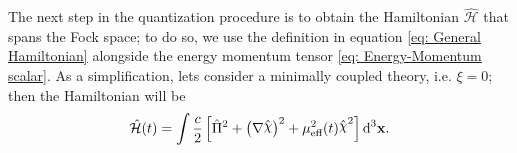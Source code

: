 \vspace*{0.25cm}
The next step in the quantization procedure is to obtain the Hamiltonian $\hat{\mathcal{H}}$ that spans the Fock space; to do so, we use the definition in equation \ref{eq: General Hamiltonian} alongside the energy momentum tensor \ref{eq: Energy-Momentum scalar}. As a simplification, lets consider a minimally coupled theory, i.e. $\xi=0$; then the Hamiltonian will be
\begin{equation}
	\hat{\mathcal{H}}(t)=\int\frac{c}{2}\left[\hat{\Pi}^2+\left(\mathbf{\nabla}\hat{\rchi}\right)^2+\mu_{\text{eff}}^2(t)\hat{\rchi}^2\right]\td^3\mathbf{x}.
\end{equation}
\begin{comment}
	\begin{multline}
		\hat{\Pi}^2=\frac{1}{c^2}\int\frac{\td^3\mathbf{k}\td^3\mathbf{q}}{(2\pi\hbar)^6}\left[\hat{a}_\mathbf{k}\hat{a}_\mathbf{q}v'_\mathbf{k}v'_\mathbf{q}e^{-i(\mathbf{k}+\mathbf{q})\mathbf{x}\hbar^{-1}}+\hat{a}_\mathbf{k}\hat{a}_\mathbf{q}^\dagger v'_\mathbf{k}v^{'*}_\mathbf{q}e^{-i(\mathbf{k}-\mathbf{q})\mathbf{x}\hbar^{-1}}\right.+\\
		+\left.\hat{a}^\dagger_\mathbf{k}\hat{a}_\mathbf{q}v^{'*}_\mathbf{k}v'_\mathbf{q}e^{i(\mathbf{k}-\mathbf{q})\mathbf{x}\hbar^{-1}}+\hat{a}_\mathbf{k}^\dagger\hat{a}_\mathbf{q}^\dagger v^{'*}_\mathbf{k}v^{'*}_\mathbf{q}e^{i(\mathbf{k}+\mathbf{q})\mathbf{x}\hbar^{-1}}\right]
	\end{multline}
	\begin{multline}
		\left(\mathbf{\nabla}\hat{\rchi}\right)^2=-\frac{1}{\hbar^2}\int\frac{\td^3\mathbf{k}\td^3\mathbf{q}}{(2\pi\hbar)^6}\mathbf{k}\mathbf{q}\left[\hat{a}_\mathbf{k}\hat{a}_\mathbf{q}v_\mathbf{k}v_\mathbf{q}e^{-i(\mathbf{k}+\mathbf{q})\mathbf{x}\hbar^{-1}}-\hat{a}_\mathbf{k}\hat{a}_\mathbf{q}^\dagger v_\mathbf{k}v^*_\mathbf{q}e^{-i(\mathbf{k}-\mathbf{q})\mathbf{x}\hbar^{-1}}-\right.\\
		-\left.\hat{a}_\mathbf{k}^\dagger\hat{a}_\mathbf{q}v_\mathbf{k}^*v_\mathbf{q}e^{i(\mathbf{k}-\mathbf{q})\mathbf{x}\hbar^{-1}}+\hat{a}^\dagger_\mathbf{k}\hat{a}^\dagger_\mathbf{q}v^*_\mathbf{k}v^*_\mathbf{q}e^{i(\mathbf{k}+\mathbf{q})\mathbf{x}\hbar^{-1}}\right]
	\end{multline}
	\begin{multline}
		\hat{\rchi}^2=\int\frac{\td^3\mathbf{k}\td^3\mathbf{q}}{(2\pi\hbar)^6}\left[\hat{a}_\mathbf{k}\hat{a}_\mathbf{q}v_\mathbf{k}v_\mathbf{q}e^{-i(\mathbf{k}+\mathbf{q})\mathbf{x}\hbar^{-1}}+\hat{a}_\mathbf{k}\hat{a}_\mathbf{q}^\dagger v_\mathbf{k}v^*_\mathbf{q}e^{-i(\mathbf{k}-\mathbf{q})\mathbf{x}\hbar^{-1}}+\right.\\

\end{comment}

